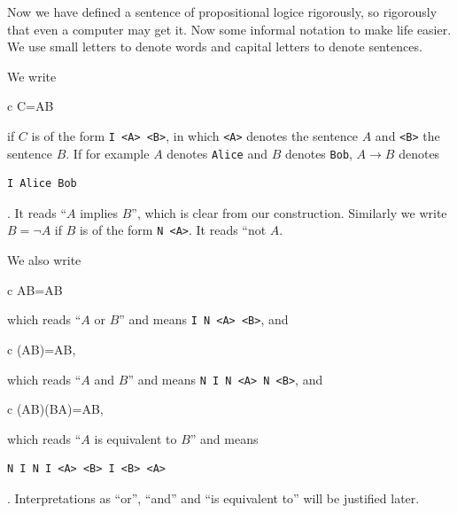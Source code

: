 \documentclass[11pt,oneside,%
]{memoir}
\newenvironment{eqna}{\begin{IEEEeqnarray}{c}}{\end{IEEEeqnarray}\ignorespacesafterend}
\theoremstyle{definition}
\begin{document}

Now we have defined a sentence of propositional logice rigorously, so rigorously that even a computer may get it. Now some informal notation to make life easier. We use small letters to denote words and capital letters to denote sentences.

We write
\begin{eqna}
    C=A\rightarrow B
\end{eqna}
if \(C\) is of the form \lstinline[language=propositio]!I <A> <B>!, in which \lstinline[language=propositio]!<A>! denotes the sentence \(A\) and \lstinline[language=propositio]!<B>! the sentence \(B\). If for example \(A\) denotes \lstinline[language=propositio]!Alice! and \(B\) denotes \lstinline[language=propositio]!Bob!, \(A\rightarrow B\) denotes
\begin{lstlisting}[language=propositio]
I Alice Bob
\end{lstlisting}
. It reads ``\(A\) implies \(B\)'', which is clear from our construction. Similarly we write \(B=\neg A\) if \(B\) is of the form \lstinline[language=propositio]!N <A>!. It reads ``not \(A\).

We also write
\begin{eqna}
    \neg A\rightarrow B=A\vee B
\end{eqna}
which reads ``\(A\) or \(B\)'' and means \lstinline[language=propositio]!I N <A> <B>!, and
\begin{eqna}
    \neg(\neg A\vee\neg B)=A\wedge B,
\end{eqna}
which reads ``\(A\) and \(B\)'' and means \lstinline[language=propositio]!N I N <A> N <B>!, and
\begin{eqna}
    (A\rightarrow B)\wedge(B\rightarrow A)=A\leftrightarrow B,
\end{eqna}
which reads ``\(A\) is equivalent to \(B\)'' and means
\begin{lstlisting}[language=propositio]
N I N I <A> <B> I <B> <A>
\end{lstlisting}
. Interpretations as ``or'', ``and'' and ``is equivalent to'' will be justified later.
\end{document}
